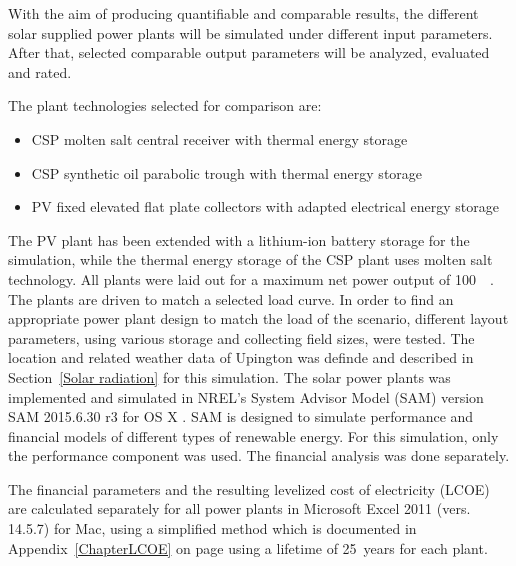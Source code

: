 With the aim of producing quantifiable and comparable results, the different solar supplied power plants will be simulated under different input  parameters. After that, selected comparable output parameters will be analyzed, evaluated and rated.

The plant technologies selected for comparison are: 
\begin{itemize}
\item CSP molten salt central receiver with thermal energy storage
\item CSP synthetic oil parabolic trough with thermal energy storage
\item PV fixed elevated flat plate collectors with adapted electrical energy storage
\end{itemize}
The PV plant has been extended with a lithium-ion battery storage for the simulation, while the thermal energy storage of the CSP plant uses molten salt technology. All plants were laid out for a maximum net power output of \SI{100}{\mega\wattel}. The plants are driven to match a selected load curve. In order to find an appropriate power plant design to match the load of the scenario, different layout parameters, using various storage and collecting field sizes, were tested. The location and related weather data of Upington was definde and described in Section~\ref{Solar radiation} for this simulation. The solar power plants was implemented and simulated in NREL’s System Advisor Model (SAM) version SAM 2015.6.30 r3 for OS X \cite{NREL2015}. SAM is designed to simulate performance and financial models of different types of renewable energy. For this simulation, only the performance component was used. The financial analysis was done separately. 

The financial parameters and the resulting levelized cost of electricity (LCOE) are calculated separately for all power plants in Microsoft Excel 2011 (vers. 14.5.7) for Mac, using a simplified method which is documented in Appendix~\ref{ChapterLCOE} on page \pageref{ChapterLCOE} using a lifetime of \SI{25}{years} for each plant.